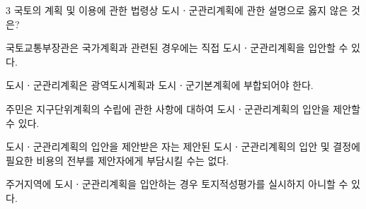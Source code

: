 \begin{question}{3}
국토의 계획 및 이용에 관한 법령상 도시ㆍ군관리계획에 관한 설명으로 옳지 않은 것은?
\begin{choices}
  \item 국토교통부장관은 국가계획과 관련된 경우에는 직접 도시ㆍ군관리계획을 입안할 수 있다.
  \item 도시ㆍ군관리계획은 광역도시계획과 도시ㆍ군기본계획에 부합되어야 한다.
  \item 주민은 지구단위계획의 수립에 관한 사항에 대하여 도시ㆍ군관리계획의 입안을 제안할 수 있다.
  \item 도시ㆍ군관리계획의 입안을 제안받은 자는 제안된 도시ㆍ군관리계획의 입안 및 결정에 필요한 비용의 전부를 제안자에게 부담시킬 수는 없다.
  \item 주거지역에 도시ㆍ군관리계획을 입안하는 경우 토지적성평가를 실시하지 아니할 수 있다.
\end{choices}
\end{question}
